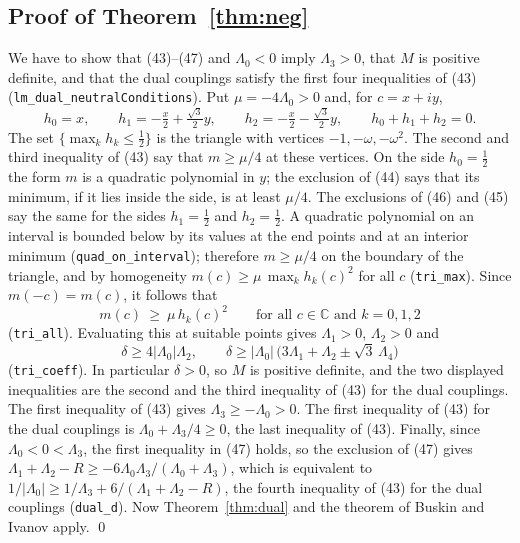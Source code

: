 \documentclass[11pt,a4paper]{amsart}
\theoremstyle{remark}
\newcommand{\C}{\mathbb{C}}
\newcommand{\La}{\Lambda}
\newcommand{\lean}[1]{\texttt{#1}}
\begin{document}
\subsection{Proof of Theorem~\ref{thm:neg}}
We have to show that (43)--(47) and $\La_0<0$ imply $\La_3>0$, that $M$ is positive definite, and that the dual
couplings satisfy the first four inequalities of (43) (\lean{lm\_dual\_neutralConditions}). Put $\mu=-4\La_0>0$ and,
for $c=x+iy$,
\[
h_0=x,\qquad h_1=-\tfrac x2+\tfrac{\sqrt3}{2}y,\qquad h_2=-\tfrac x2-\tfrac{\sqrt3}{2}y,\qquad h_0+h_1+h_2=0 .
\]
The set $\{\max_kh_k\le\frac12\}$ is the triangle with vertices $-1,-\omega,-\omega^2$. The second and third
inequality of (43) say that $m\ge\mu/4$ at these vertices. On the side $h_0=\frac12$ the form $m$ is a quadratic
polynomial in $y$; the exclusion of (44) says that its minimum, if it lies inside the side, is at least $\mu/4$.
The exclusions of (46) and (45) say the same for the sides $h_1=\frac12$ and $h_2=\frac12$. A quadratic polynomial
on an interval is bounded below by its values at the end points and at an interior minimum
(\lean{quad\_on\_interval}); therefore $m\ge\mu/4$ on the boundary of the triangle, and by homogeneity
$m(c)\ge\mu\,\max_kh_k(c)^2$ for all $c$ (\lean{tri\_max}). Since $m(-c)=m(c)$, it follows that
\[
m(c)\ \ge\ \mu\,h_k(c)^2\qquad\text{for all }c\in\C\text{ and }k=0,1,2
\]
(\lean{tri\_all}). Evaluating this at suitable points gives $\La_1>0$, $\La_2>0$ and
\[
\delta\ge4|\La_0|\La_2,\qquad \delta\ge|\La_0|\,\bigl(3\La_1+\La_2\pm\sqrt3\,\La_4\bigr)
\]
(\lean{tri\_coeff}). In particular $\delta>0$, so $M$ is positive definite, and the two displayed inequalities are
the second and the third inequality of (43) for the dual couplings. The first inequality of (43) gives
$\La_3\ge-\La_0>0$. The first inequality of (43) for the dual couplings is $\La_0+\La_3/4\ge0$, the last
inequality of (43). Finally, since $\La_0<0<\La_3$, the first inequality in (47) holds, so the exclusion of (47)
gives $\La_1+\La_2-R\ge-6\La_0\La_3/(\La_0+\La_3)$, which is equivalent to
$1/|\La_0|\ge1/\La_3+6/(\La_1+\La_2-R)$, the fourth inequality of (43) for the dual couplings
(\lean{dual\_d}). Now Theorem~\ref{thm:dual} and the theorem of Buskin and Ivanov apply. \qed
\end{document}
